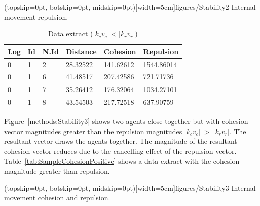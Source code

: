 \documentclass{ieeeaccess}
\begin{document}
\Figure[t!](topskip=0pt, botskip=0pt, midskip=0pt)[width=5cm]{figures/Stability2}
{Internal movement repulsion.\label{methods:Stability2}}


\begin{table}[H]
\begin{center}
\begin{tabular}{| l | l | l | l | l | l |}
\hline
Log &	Id &	N.Id &	Distance &	{\color{green}Cohesion} &	{\color{red}Repulsion} 	\\ \hline
0 & 1 & 2 & 28.32522 & {\color{green}141.62612} & {\color{red}1544.86014} \\ \hline
0 & 1 & 6 & 41.48517 & {\color{green}207.42586} & {\color{red}721.71736} \\ \hline
0 & 1 & 7 & 35.26412 & {\color{green}176.32064} & {\color{red}1034.27101} \\ \hline
0 & 1 & 8 & 43.54503 & {\color{green}217.72518} & {\color{red}637.90759} \\
\hline
\end{tabular}\caption{Data extract ($|k_cv_c| < |k_rv_r|$)} \label{tab:SampleReplusionPositive}
\end{center}
\end{table}

Figure~\ref{methods:Stability3} shows two agents close together but with cohesion vector magnitudes greater than the repulsion magnitudes $|k_cv_c|~>~|k_rv_r|$. The resultant vector draws the agents together. The magnitude of the resultant cohesion vector reduces due to the cancelling effect of the repulsion vector. Table~\ref{tab:SampleCohesionPositive} shows a data extract with the cohesion magnitude greater than repulsion.

\Figure[t!](topskip=0pt, botskip=0pt, midskip=0pt)[width=5cm]{figures/Stability3}
{Internal movement cohesion and repulsion.\label{methods:Stability3}}

\end{document}
